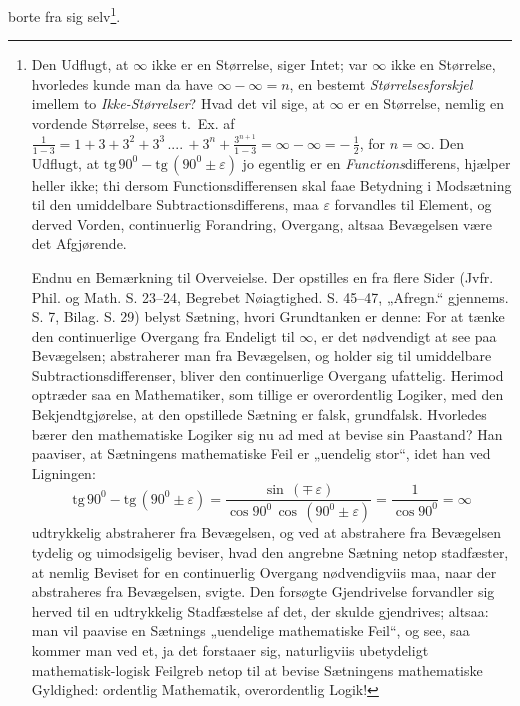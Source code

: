 \documentclass[12pt,a4paper]{book}
\begin{document}
borte fra sig selv\footnote{Den Udflugt, at $\infty$ ikke er en
Størrelse, siger Intet; var $\infty$ ikke en Størrelse, hvorledes kunde
man da have $\infty - \infty = n$, en bestemt \emph{Størrelsesforskjel}
imellem to \emph{Ikke-Størrelser}? Hvad det vil sige, at $\infty$ er en
Størrelse, nemlig en vordende Størrelse, sees t.~Ex. af $\frac{1}{1-3}
= 1 + 3 + 3^{2} + 3^{3}\,....\,+ 3^{n} + \frac{3^{n+1}}{1-3} =
\infty - \infty = -\,\frac{1}{2}$, for $n = \infty$. Den Udflugt, at
$\mathrm{tg}\,90^{0} - \mathrm{tg}\,(90^{0} \pm \varepsilon)$ jo
egentlig er en \emph{Functions}differens, hjælper heller ikke; thi
dersom Functionsdifferensen skal faae Betydning i Modsætning til den
umiddelbare Subtractionsdifferens, maa $\varepsilon$ forvandles til
Element, og derved Vorden, continuerlig Forandring, Overgang, altsaa
Bevægelsen være det Afgjørende.
\par Endnu en Bemærkning til Overveielse. Der opstilles en fra flere
Sider (Jvfr. Phil. og Math. S. 23--24, Begrebet Nøiagtighed.
S. 45--47, „Afregn.“ gjennems. S. 7, Bilag. S. 29) belyst Sætning,
hvori Grundtanken er denne: For at tænke den continuerlige Overgang fra
Endeligt til $\infty$, er det nødvendigt at see paa Bevægelsen;
abstraherer man fra Bevægelsen, og holder sig til umiddelbare
Subtractionsdifferenser, bliver den continuerlige Overgang ufattelig.
Herimod optræder saa en Mathematiker, som tillige er overordentlig
Logiker, med den Bekjendtgjørelse, at den opstillede Sætning er falsk,
grundfalsk. Hvorledes bærer den mathematiske Logiker sig nu ad med at
bevise sin Paastand? Han paaviser, at Sætningens mathematiske Feil er
„uendelig stor“, idet han ved Ligningen:
\[ \mathrm{tg}\,90^{0} - \mathrm{tg}\,(90^{0} \pm \varepsilon) =
\frac{\sin\,(\mp\,\varepsilon)}{\cos 90^{0}\,\cos\,(90^{0} \pm
\varepsilon)} = \frac{1}{\cos 90^{0}} = \infty \]
udtrykkelig abstraherer fra Bevægelsen, og ved at abstrahere fra
Bevægelsen tydelig og uimodsigelig beviser, hvad den angrebne Sætning
netop stadfæster, at nemlig Beviset for en continuerlig Overgang
nødvendigviis maa, naar der abstraheres fra Bevægelsen, svigte. Den
forsøgte Gjendrivelse forvandler sig herved til en udtrykkelig
Stadfæstelse af det, der skulde gjendrives; altsaa: man vil paavise en
Sætnings „uendelige mathematiske Feil“, og see, saa kommer man ved et,
ja det forstaaer sig, naturligviis ubetydeligt mathematisk-logisk
Feilgreb netop til at bevise Sætningens mathematiske Gyldighed:
ordentlig Mathematik, overordentlig Logik!}.
\end{document}
